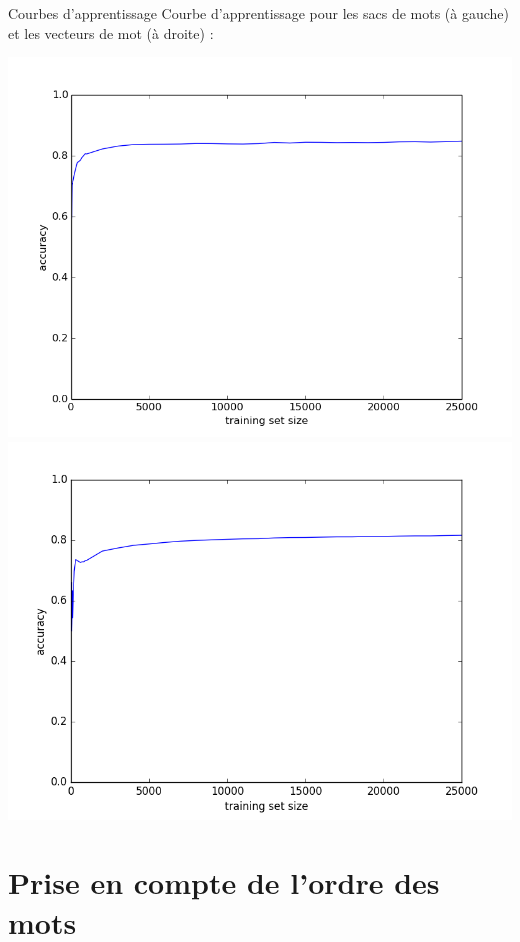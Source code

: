 \documentclass{beamer}
\begin{document}
\begin{frame}{Courbes d'apprentissage}
Courbe d'apprentissage pour les sacs de mots (à gauche) et les vecteurs de mot (à droite) :
\begin{center}
\includegraphics[scale=0.25]{images/learning_curve_lr_bow.png}
\includegraphics[scale=0.25]{images/learning_curve_lr_vec.png}
\end{center}
\end{frame}

\section{Prise en compte de l'ordre des mots}
\end{document}
